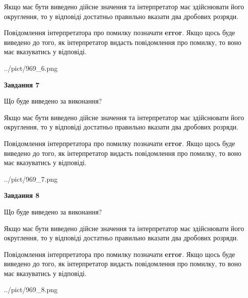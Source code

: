 \documentclass[12pt, ukrainian]{article}
\begin{document}
{\begin {Large}
Якщо має бути виведено дійсне значення та інтерпретатор має здійснювати його округлення, 
то у відповіді достатньо правильно вказати два дробових розряди.

Повідомлення інтерпретатора про помилку позначати \textbf{error}.
Якщо щось буде виведено до того, як інтерпретатор видасть повідомлення про помилку, 
то воно має вказуватись у відповіді. \par

\begin{center}
	{../pict/969_6.png}
\end{center}
\newpage

{\begin {center}\textbf{Завдання 7}\end {center}}\par
Що буде виведено за виконання? \par

Якщо має бути виведено дійсне значення та інтерпретатор має здійснювати його округлення, 
то у відповіді достатньо правильно вказати два дробових розряди.

Повідомлення інтерпретатора про помилку позначати \textbf{error}.
Якщо щось буде виведено до того, як інтерпретатор видасть повідомлення про помилку, 
то воно має вказуватись у відповіді. \par

\begin{center}
	{../pict/969_7.png}
\end{center}
\newpage

{\begin {center}\textbf{Завдання 8}\end {center}}\par
Що буде виведено за виконання? \par

Якщо має бути виведено дійсне значення та інтерпретатор має здійснювати його округлення, 
то у відповіді достатньо правильно вказати два дробових розряди.

Повідомлення інтерпретатора про помилку позначати \textbf{error}.
Якщо щось буде виведено до того, як інтерпретатор видасть повідомлення про помилку, 
то воно має вказуватись у відповіді. \par

\begin{center}
	{../pict/969_8.png}
\end{center}
\newpage


\end{Large}}
\end{document}
